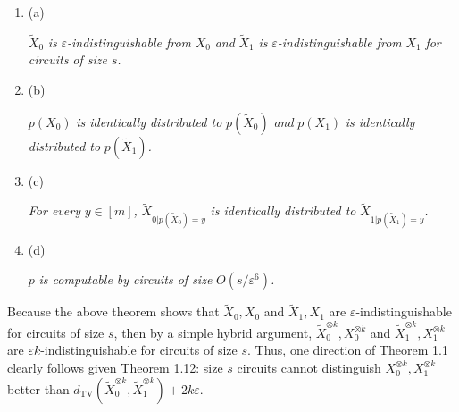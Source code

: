 \documentclass[10pt,a4paper]{article}
\begin{document}
\begin{enumerate}


\item[] 
(a) 


$\widetilde{X}_{0}$\emph{ is }$\varepsilon$\emph{-indistinguishable from }$X_{0}$\emph{ and }$\widetilde{X}_{1}$\emph{ is }$\varepsilon$\emph{-indistinguishable from }$X_{1}$\emph{ for circuits of size }$s$\emph{.}\par





\item[] 
(b) 


$p(X_{0})$\emph{ is identically distributed to }$p(\widetilde{X}_{0})$\emph{ and }$p(X_{1})$\emph{ is identically distributed to }$p(\widetilde{X}_{1})$\emph{.}\par





\item[] 
(c) 


\emph{For every }$y\in[m]$\emph{, }$\widetilde{X}_{0|p(\widetilde{X}_{0})=y}$\emph{ is identically distributed to }$\widetilde{X}_{1|p(\widetilde{X}_{1})=y}$\emph{.}\par





\item[] 
(d) 


$p$\emph{ is computable by circuits of size }$O(s/\varepsilon^{6})$\emph{.}\par





\end{enumerate}






Because the above theorem shows that $\widetilde{X}_{0},X_{0}$ and $\widetilde{X}_{1},X_{1}$ are $\varepsilon$-indistinguishable for circuits of size $s$, then by a simple hybrid argument, $\widetilde{X}_{0}^{\otimes k},X_{0}^{\otimes k}$ and $\widetilde{X}_{1}^{\otimes k},X_{1}^{\otimes k}$ are $\varepsilon k$-indistinguishable for circuits of size $s$. Thus, one direction of Theorem 1.1 clearly follows given Theorem 1.12: size $s$ circuits cannot distinguish $X_{0}^{\otimes k},X_{1}^{\otimes k}$ better than $d_{\mathrm{TV}}(\widetilde{X}_{0}^{\otimes k},\widetilde{X}_{1}^{\otimes k})+2k\varepsilon$.\par
\end{document}
